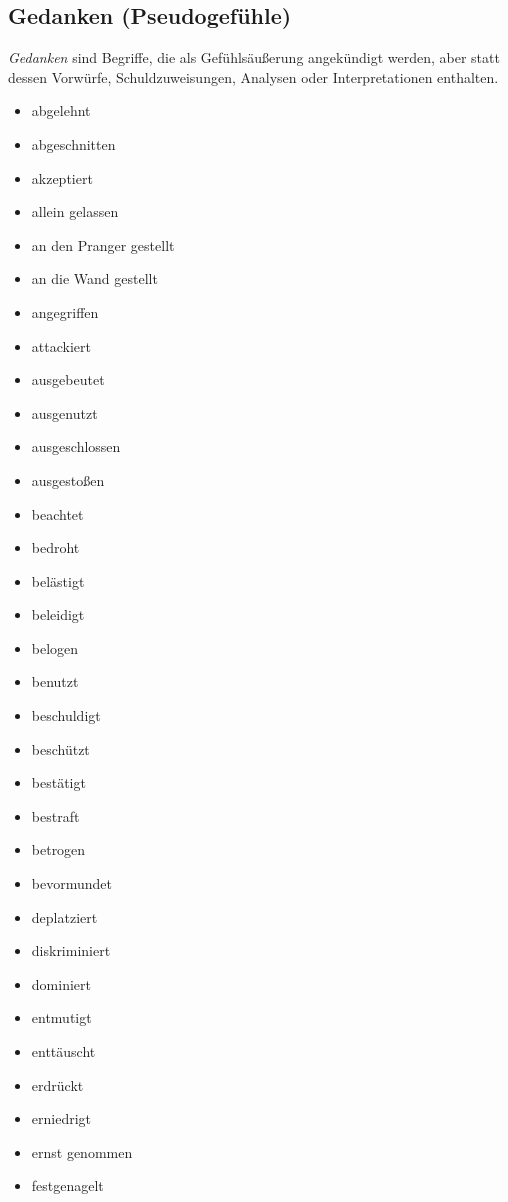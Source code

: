 \subsection{Gedanken (\glqq Pseudogefühle\grqq)}

\emph{Gedanken} sind Begriffe, die als Gefühlsäußerung angekündigt werden, aber statt dessen Vorwürfe, Schuldzuweisungen, Analysen oder Interpretationen enthalten.

\begin{multicols}{2}
  \begin{itemize}
    \item abgelehnt
    \item abgeschnitten
    \item akzeptiert
    \item allein gelassen
    \item an den Pranger gestellt
    \item an die Wand gestellt
    \item angegriffen
    \item attackiert
    \item ausgebeutet
    \item ausgenutzt
    \item ausgeschlossen
    \item ausgestoßen
    \item beachtet
    \item bedroht
    \item belästigt
    \item beleidigt
    \item belogen
    \item benutzt
    \item beschuldigt
    \item beschützt
    \item bestätigt
    \item bestraft
    \item betrogen
    \item bevormundet
    \item deplatziert
    \item diskriminiert
    \item dominiert
    \item entmutigt
    \item enttäuscht
    \item erdrückt
    \item erniedrigt
    \item ernst genommen
    \item festgenagelt

\end{itemize}
\end{multicols}
